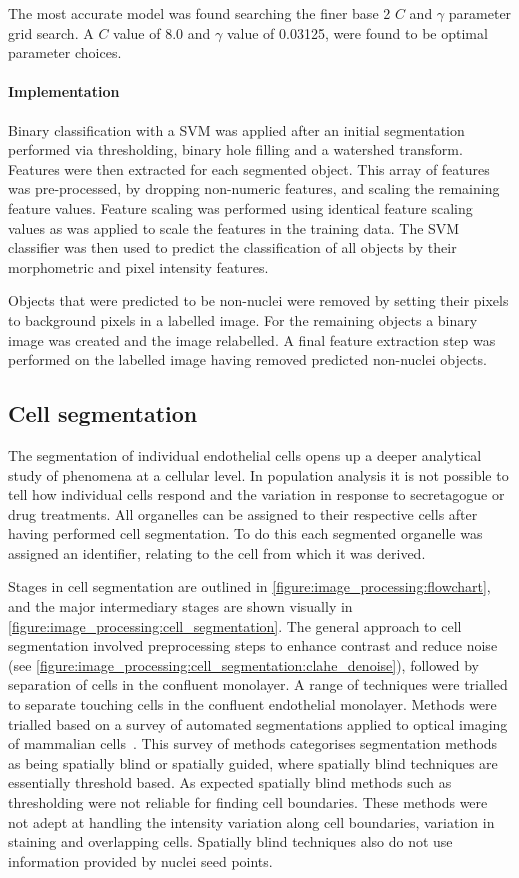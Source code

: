 The most accurate model was found searching the finer base 2 $C$ and $\gamma$ parameter grid search. A $C$ value of 8.0 and $\gamma$ value of 0.03125, were found to be optimal parameter choices.

\paragraph{Implementation}
Binary classification with a SVM was applied after an initial segmentation performed via thresholding, binary hole filling and a watershed transform. Features were then extracted for each segmented object. This array of features was pre-processed, by dropping non-numeric features, and scaling the remaining feature values. Feature scaling was performed using identical feature scaling values as was applied to scale the features in the training data. The SVM classifier was then used to predict the classification of all objects by their morphometric and pixel intensity features.

Objects that were predicted to be non-nuclei were removed by setting their pixels to background pixels in a labelled image. For the remaining objects a binary image was created and the image relabelled. A final feature extraction step was performed on the labelled image having removed predicted non-nuclei objects.

\subsection{Cell segmentation}
\label{endothelial_morphometry:image_processing:cell}
The segmentation of individual endothelial cells opens up a deeper analytical study of phenomena at a cellular level. In population analysis it is not possible to tell how individual cells respond and the variation in response to secretagogue or drug treatments. All organelles can be assigned to their respective cells after having performed cell segmentation. To do this each segmented organelle was assigned an identifier, relating to the cell from which it was derived. 

Stages in cell segmentation are outlined in \autoref{figure:image_processing:flowchart}, and the major intermediary stages are shown visually in \autoref{figure:image_processing:cell_segmentation}. The general approach to cell segmentation involved preprocessing steps to enhance contrast and reduce noise (see \autoref{figure:image_processing:cell_segmentation:clahe_denoise}), followed by separation of cells in the confluent monolayer. A range of techniques were trialled to separate touching cells in the confluent endothelial monolayer. Methods were trialled based on a survey of automated segmentations applied to optical imaging of mammalian cells~\cite{Bajcsy2015}. This survey of methods categorises segmentation methods as being spatially blind or spatially guided, where spatially blind techniques are essentially threshold based. As expected spatially blind methods such as thresholding were not reliable for finding cell boundaries. These methods were not adept at handling the intensity variation along cell boundaries, variation in staining and overlapping cells. Spatially blind techniques also do not use information provided by nuclei seed points.

